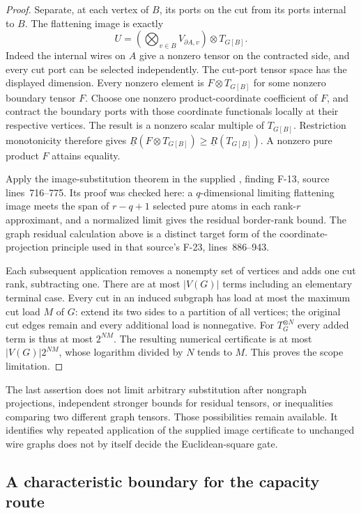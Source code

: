 \begin{proof}
Separate, at each vertex of $B$, its ports on the cut from its ports
internal to $B$. The flattening image is exactly
\[
 U=\left(\bigotimes_{v\in B}V_{\partial A,v}\right)
       \otimes T_{G[B]}.
\]
Indeed the internal wires on $A$ give a nonzero tensor on the
contracted side, and every cut port can be selected independently.
The cut-port tensor space has the displayed dimension. Every
nonzero element is $F\otimes T_{G[B]}$ for some nonzero boundary
tensor $F$. Choose one nonzero product-coordinate coefficient of
$F$, and contract the boundary ports with those coordinate
functionals locally at their respective vertices. The result is
a nonzero scalar multiple of $T_{G[B]}$. Restriction monotonicity
therefore gives $\underline R(F\otimes T_{G[B]})\geq
\underline R(T_{G[B]})$. A nonzero pure product $F$ attains equality.

Apply the image-substitution theorem in the supplied
, finding F-13, source lines~716--775. Its
proof was checked here: a $q$-dimensional limiting flattening image
meets the span of $r-q+1$ selected pure atoms in each rank-$r$
approximant, and a normalized limit gives the residual border-rank
bound. The graph residual calculation above is a distinct target
form of the coordinate-projection principle used in that source's
F-23, lines~886--943.

Each subsequent application removes a nonempty set of vertices and
adds one cut rank, subtracting one. There are at most $|V(G)|$
terms including an elementary terminal case. Every cut in an
induced subgraph has load at most the maximum cut load $M$ of
$G$: extend its two sides to a partition of all vertices; the
original cut edges remain and every additional load is nonnegative.
For $T_G^{\otimes N}$ every added term is thus at most $2^{NM}$.
The resulting numerical certificate is at most
$|V(G)|2^{NM}$, whose logarithm divided by $N$ tends to $M$.
This proves the scope limitation.
\end{proof}

The last assertion does not limit arbitrary substitution after
nongraph projections, independent stronger bounds for residual
tensors, or inequalities comparing two different graph tensors.
Those possibilities remain available. It identifies why repeated
application of the supplied image certificate to unchanged wire
graphs does not by itself decide the Euclidean-square gate.
\subsection{A characteristic boundary for the capacity route}
\label{sec:rt-capacity-characteristic}

